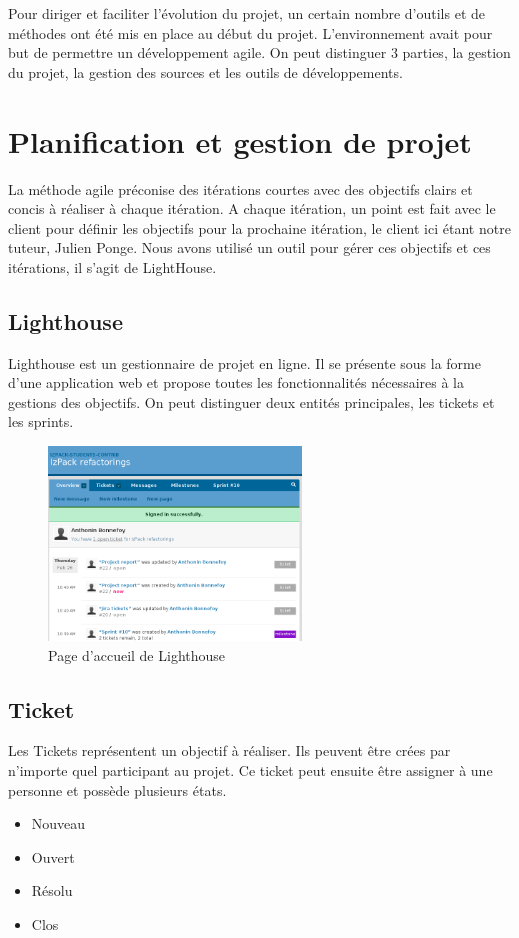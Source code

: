 Pour diriger et faciliter l'évolution du projet, un certain nombre d'outils et de méthodes ont été mis en place au début du projet.
L'environnement avait pour but de permettre un développement agile.
On peut distinguer 3 parties, la gestion du projet, la gestion des sources et les outils de développements.
\section{Planification et gestion de projet}
La méthode agile préconise des itérations courtes avec des objectifs clairs et concis à réaliser à chaque itération.
A chaque itération, un point est fait avec le client pour définir les objectifs pour la prochaine itération, le client ici étant notre tuteur, Julien Ponge.
Nous avons utilisé un outil pour gérer ces objectifs et ces itérations, il s'agit de LightHouse.
\subsection{Lighthouse}
Lighthouse est un gestionnaire de projet en ligne.
Il se présente sous la forme d'une application web et propose toutes les fonctionnalités nécessaires à la gestions des objectifs.
On peut distinguer deux entités principales, les tickets et les sprints.
\begin{figure}[H]
	\centering
	\includegraphics[width=0.6\textwidth]{../image/lighthouse.png}
	\caption{Page d'accueil de Lighthouse}
\end{figure}
\subsection{Ticket}
Les Tickets représentent un objectif à réaliser.
Ils peuvent être crées par n'importe quel participant au projet. 
Ce ticket peut ensuite être assigner à une personne et possède plusieurs états.
\begin{itemize}
\item Nouveau
\item Ouvert
\item Résolu
\item Clos
\end{itemize}

